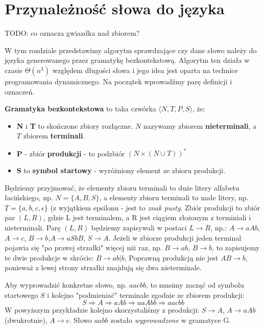 \section{Przynależność słowa do języka}

\label{sec:gramatyki}

TODO: co oznacza gwiazdka nad zbiorem?

W tym rozdziale przedstawimy algorytm sprawdzające czy dane słowo należy do języka generowanego przez gramatykę bezkontekstową.
Algorytm ten działa w czasie $\Theta(n^3)$ względem długości słowa i jego idea jest oparta na technice programowania dynamicznego.
Na początek wprowadźmy parę definicji i oznaczeń.

\begin{definition}
\textbf{Gramatyka bezkontekstowa} to taka czwórka $\langle N, T, P, S \rangle$, że:
    \begin{itemize}
    	\item \textbf{N} i \textbf{T} to skończone zbiory rozłączne. 
        $N$ nazywamy zbiorem \textbf{nieterminali}, a $T$ zbiorem \textbf{terminali}.
        \item \textbf{P} - zbiór \textbf{produkcji} - to podzbiór $(N \times (N\cup T ))^*$
        \item \textbf{S} to \textbf{symbol startowy} - wyróżniony element ze zbioru produkcji.
    \end{itemize}
\end{definition}
Będziemy przyjmować, że elementy zbioru terminali to duże litery alfabetu łacińskiego, np. $N = \{ A, B, S\}$, a elementy zbioru terminali to małe litery, np. $T = \{ a, b, c, \epsilon\}$ (z wyjątkiem epsilonu - jest to \textit{znak pusty}.
Zbiór produkcji to zbiór par $(L, R)$, gdzie L jest terminalem, a R jest ciągiem złożonym z terminiali i nieterminali. 
Parę $(L, R)$ będziemy zapisywali w postaci $L \rightarrow R$, np.: $A \rightarrow aAb$, $A \rightarrow c$, $B \rightarrow b$,$A \rightarrow aSbB$, $S \rightarrow A$. 
Jeżeli w zbiorze produkcji jeden terminal pojawia się "po prawej strzałki" więcej niż raz, np. $B \rightarrow ab$, $B \rightarrow b$, to zapisujemy te dwie produkcje w skrócie: $B \rightarrow ab |  b$, 
Poprawną produkcją nie jest $AB \rightarrow b$, ponieważ z lewej strony strzałki znajdują się dwa nieterminale.

Aby wyprowadzić konkretne słowo, np. $aacbb$, to musimy zacząć od symbolu startowego $S$ i kolejno "podmieniać" terminale zgodnie ze zbiorem produkcji:
 \[ S \Rightarrow A \Rightarrow aAb \Rightarrow aaAbb \Rightarrow aacbb \]
W powyższym przykładzie kolejno skorzystaliśmy z produkcji: $S \rightarrow A$, $A \rightarrow aAb$ (dwukrotnie),   $A \rightarrow c$. Słowo $aabb$ zostało \textit{wyprowadzone} w gramatyce G.


